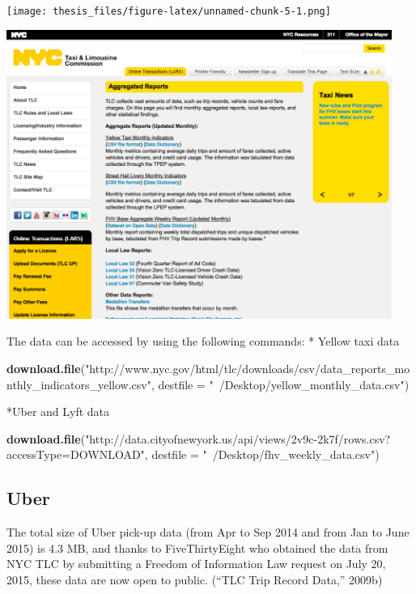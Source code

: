 \documentclass[12pt,twoside]{reedthesis}
\newenvironment{Shaded}{\begin{snugshade}}{\end{snugshade}}
\newcommand{\KeywordTok}[1]{\textcolor[rgb]{0.13,0.29,0.53}{\textbf{#1}}}
\newcommand{\DataTypeTok}[1]{\textcolor[rgb]{0.13,0.29,0.53}{#1}}
\newcommand{\StringTok}[1]{\textcolor[rgb]{0.31,0.60,0.02}{#1}}
\newcommand{\NormalTok}[1]{#1}
\theoremstyle{definition}
\theoremstyle{definition}
\theoremstyle{definition}
\theoremstyle{remark}
\begin{document}
\texttt{[image: thesis\_files/figure-latex/unnamed-chunk-5-1.png]}
\begin{center}\includegraphics[width=4.96in]{figure/a-report} \end{center}

The data can be accessed by using the following commands: * Yellow taxi
data
\begin{Shaded}
\begin{Highlighting}[]
\KeywordTok{download.file}\NormalTok{(}\StringTok{"http://www.nyc.gov/html/tlc/downloads/csv/data_reports_monthly_indicators_yellow.csv"}\NormalTok{, }
    \DataTypeTok{destfile =} \StringTok{"~/Desktop/yellow_monthly_data.csv"}\NormalTok{)}
\end{Highlighting}
\end{Shaded}
*Uber and Lyft data
\begin{Shaded}
\begin{Highlighting}[]
\KeywordTok{download.file}\NormalTok{(}\StringTok{"http://data.cityofnewyork.us/api/views/2v9c-2k7f/rows.csv?accessType=DOWNLOAD"}\NormalTok{, }
    \DataTypeTok{destfile =} \StringTok{"~/Desktop/fhv_weekly_data.csv"}\NormalTok{)}
\end{Highlighting}
\end{Shaded}
\subsection{Uber}\label{uber-1}

The total size of Uber pick-up data (from Apr to Sep 2014 and from Jan
to June 2015) is 4.3 MB, and thanks to FiveThirtyEight who obtained the
data from NYC TLC by submitting a Freedom of Information Law request on
July 20, 2015, these data are now open to public. (``TLC Trip Record
Data,'' 2009b)
\end{document}
